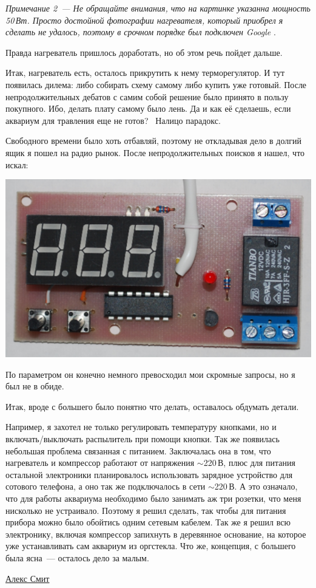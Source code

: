 \documentclass{magazine}
\begin{document}
{\emph{Примечание 2\ --- Не обращайте внимания, что на картинке указанна 
мощность 50\,Вт. Просто достойной фотографии нагревателя, который 
приобрел я сделать не удалось, поэтому в срочном порядке был подключен 
Google \smiley}.

Правда нагреватель пришлось доработать, но об этом речь пойдет дальше.

Итак, нагреватель есть, осталось прикрутить к нему терморегулятор. И тут
появилась дилема: либо собирать схему самому либо купить уже готовый.
После непродолжительных дебатов с самим собой решение было принято в пользу
покупного. Ибо, делать плату самому было лень. Да и как её сделаешь, если
аквариум для травления еще не готов? \smiley\ Налицо парадокс. \smiley

Свободного времени было хоть отбавляй, поэтому не откладывая дело в долгий ящик
я пошел на радио рынок. После непродолжительных поисков я нашел, что искал:

\noindent\includegraphics[width=\columnwidth]{fig/00/smit/ee000024.png}

По параметром он конечно немного превосходил мои скромные запросы, но я был не в
обиде.

Итак, вроде с большего было понятно что делать, оставалось обдумать детали.

Например, я захотел не только регулировать температуру кнопками, но и
включать/выключать распылитель при помощи кнопки. Так же появилась небольшая
проблема связанная с питанием. Заключалась она в том, что нагреватель и
компрессор работают от напряжения $\sim$220\,В, плюс для питания остальной
электроники планировалось использовать зарядное устройство для сотового
телефона, а оно так же подключалось в сети $\sim$220\,В. А это означало, что для
работы аквариума необходимо было занимать аж три розетки, что меня нисколько не
устраивало. Поэтому я решил сделать, так чтобы для питания прибора можно было
обойтись одним сетевым кабелем. Так же я решил всю электронику, включая
компрессор запихнуть в деревянное основание, на которое уже устанавливать сам
аквариум из оргстекла. Что же, концепция, с большего была ясна\ --- осталось
дело за малым. \smiley

}{\href{mailto:zamuhrishka@inbox.ru}{Алекс Смит}}
\end{document}
